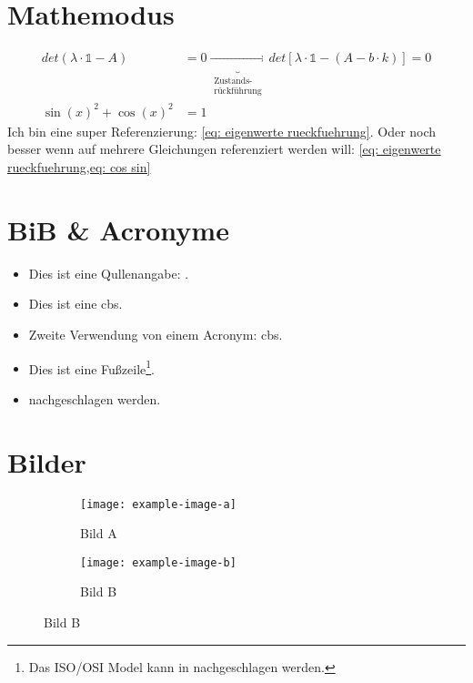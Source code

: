 \documentclass[./\jobname.tex]{subfiles}
\begin{document}
%
	\blindmathtrue
	\blinddocument
\chapter{Mathemodus}
%
\begin{align}
det(\lambda \cdot \mathds{1} -A) &= 0 \underbrace{\longrightarrow}_{\substack{\text{Zustands-} \\ \text{rückführung}}} det\left[\lambda\cdot \mathds{1} - \left(A-b\cdot k\right)\right]=0\label{eq: eigenwerte rueckfuehrung}\\
\sin(x)^{2} + \cos(x)^{2} &= 1\label{eq: cos sin}
\end{align}
%
Ich bin eine super Referenzierung: \cref{eq: eigenwerte rueckfuehrung}. Oder noch besser wenn auf mehrere Gleichungen referenziert werden will: \cref{eq: eigenwerte rueckfuehrung,eq: cos sin}
%
\chapter{BiB \& Acronyme}
%
\begin{itemize}
	\item Dies ist eine Qullenangabe: \parencite[Vgl.][S.220-224]{IEEE802.1Q2014}.
	\item Dies ist eine \gls{cbs}.
	\item Zweite Verwendung von einem Acronym: \gls{cbs}.
	\item Dies ist eine Fußzeile\footnote{Das ISO/OSI Model kann in \cite[][S.2-9]{Mandl2010} nachgeschlagen werden.}.
	\item \parencite[][S.2-9]{Mandl2010} nachgeschlagen werden.
\end{itemize}
%
\chapter{Bilder}
%
\begin{figure}[H]
\centering
\noindent{}
	\label{fig: example-image}
\end{figure}
%
\begin{figure}[H]
	\centering
	\begin{subfigure}[b]{0.5\textwidth}
		\centering
		\texttt{[image: example-image-a]}
		\caption{Bild A}
		\label{fig: Bild A}
	\end{subfigure}%
	\begin{subfigure}[b]{0.5\textwidth}
		\centering
		\texttt{[image: example-image-b]}
		\caption{Bild B}
		\label{fig: Bild B}
	\end{subfigure}%
	\label{fig: Bild A und B}
\end{figure}
%
\end{document}
